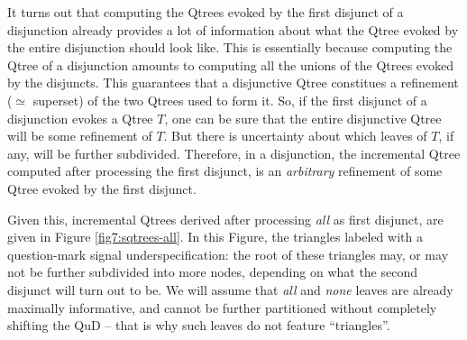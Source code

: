 It turns out that computing the Qtrees evoked by the first disjunct of a disjunction already provides a lot of information about what the Qtree evoked by the entire disjunction should look like. This is essentially because computing the Qtree of a disjunction amounts to computing all the unions of the Qtrees evoked by the disjuncts. This guarantees that a disjunctive Qtree constitues a refinement ($\simeq$ superset) of the two Qtrees used to form it. So, if the first disjunct of a disjunction evokes a Qtree $T$, one can be sure that the entire disjunctive Qtree will be some refinement of $T$. But there is uncertainty about which leaves of $T$, if any, will be further subdivided. Therefore, in a disjunction, the incremental Qtree computed after processing the first disjunct, is an \textit{arbitrary} refinement of some Qtree evoked by the first disjunct.

Given this, incremental Qtrees  derived after processing \textit{all} as first disjunct, are given in Figure \ref{fig7:sqtrees-all}. In this Figure, the triangles labeled with a question-mark signal underspecification: the root of these triangles may, or may not be further subdivided into more nodes, depending on what the second disjunct will turn out to be. We will assume that \textit{all} and \textit{none} leaves are already maximally informative, and cannot be further partitioned without completely shifting the QuD -- that is why such leaves do not feature ``triangles''. 


